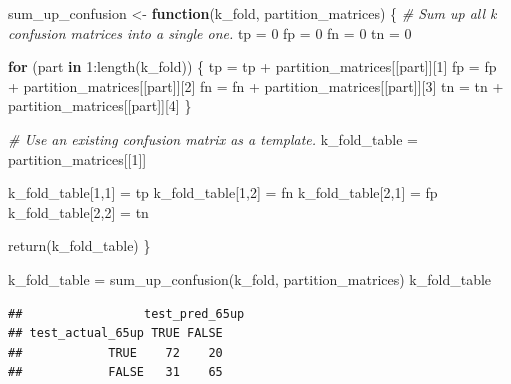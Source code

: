 \documentclass[
]{article}
\newenvironment{Shaded}{\begin{snugshade}}{\end{snugshade}}
\newcommand{\CommentTok}[1]{\textcolor[rgb]{0.56,0.35,0.01}{\textit{#1}}}
\newcommand{\ControlFlowTok}[1]{\textcolor[rgb]{0.13,0.29,0.53}{\textbf{#1}}}
\newcommand{\DecValTok}[1]{\textcolor[rgb]{0.00,0.00,0.81}{#1}}
\newcommand{\FunctionTok}[1]{\textcolor[rgb]{0.00,0.00,0.00}{#1}}
\newcommand{\NormalTok}[1]{#1}
\newcommand{\OtherTok}[1]{\textcolor[rgb]{0.56,0.35,0.01}{#1}}
\newcommand{\SpecialCharTok}[1]{\textcolor[rgb]{0.00,0.00,0.00}{#1}}
\begin{document}
\begin{Shaded}
\begin{Highlighting}[]
\NormalTok{sum\_up\_confusion }\OtherTok{\textless{}{-}} \ControlFlowTok{function}\NormalTok{(k\_fold, partition\_matrices) \{}
  \CommentTok{\# Sum up all k confusion matrices into a single one.}
\NormalTok{  tp }\OtherTok{=} \DecValTok{0}
\NormalTok{  fp }\OtherTok{=} \DecValTok{0}
\NormalTok{  fn }\OtherTok{=} \DecValTok{0}
\NormalTok{  tn }\OtherTok{=} \DecValTok{0}
  
  \ControlFlowTok{for}\NormalTok{ (part }\ControlFlowTok{in} \DecValTok{1}\SpecialCharTok{:}\FunctionTok{length}\NormalTok{(k\_fold)) \{}
\NormalTok{    tp }\OtherTok{=}\NormalTok{ tp }\SpecialCharTok{+}\NormalTok{ partition\_matrices[[part]][}\DecValTok{1}\NormalTok{]}
\NormalTok{    fp }\OtherTok{=}\NormalTok{ fp }\SpecialCharTok{+}\NormalTok{ partition\_matrices[[part]][}\DecValTok{2}\NormalTok{]}
\NormalTok{    fn }\OtherTok{=}\NormalTok{ fn }\SpecialCharTok{+}\NormalTok{ partition\_matrices[[part]][}\DecValTok{3}\NormalTok{]}
\NormalTok{    tn }\OtherTok{=}\NormalTok{ tn }\SpecialCharTok{+}\NormalTok{ partition\_matrices[[part]][}\DecValTok{4}\NormalTok{]}
\NormalTok{  \}}
  
  \CommentTok{\# Use an existing confusion matrix as a template.}
\NormalTok{  k\_fold\_table }\OtherTok{=}\NormalTok{ partition\_matrices[[}\DecValTok{1}\NormalTok{]]}
  
\NormalTok{  k\_fold\_table[}\DecValTok{1}\NormalTok{,}\DecValTok{1}\NormalTok{] }\OtherTok{=}\NormalTok{ tp}
\NormalTok{  k\_fold\_table[}\DecValTok{1}\NormalTok{,}\DecValTok{2}\NormalTok{] }\OtherTok{=}\NormalTok{ fn}
\NormalTok{  k\_fold\_table[}\DecValTok{2}\NormalTok{,}\DecValTok{1}\NormalTok{] }\OtherTok{=}\NormalTok{ fp}
\NormalTok{  k\_fold\_table[}\DecValTok{2}\NormalTok{,}\DecValTok{2}\NormalTok{] }\OtherTok{=}\NormalTok{ tn}
  
  \FunctionTok{return}\NormalTok{(k\_fold\_table)}
\NormalTok{\} }

\NormalTok{k\_fold\_table }\OtherTok{=} \FunctionTok{sum\_up\_confusion}\NormalTok{(k\_fold, partition\_matrices)}
\NormalTok{k\_fold\_table}
\end{Highlighting}
\end{Shaded}

\begin{verbatim}
##                 test_pred_65up
## test_actual_65up TRUE FALSE
##            TRUE    72    20
##            FALSE   31    65
\end{verbatim}
\end{document}
